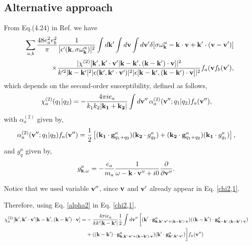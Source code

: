 \documentclass[12pt,a4paper,ruledheader]{report}
\begin{document}
\begin{appendix}
\section{Alternative approach}
\label{sec:alt-approx}
From Eq.(4.24) in Ref. \cite{YZKS16} we have
\begin{eqnarray}
\label{Eq4.24}
&&
\sum_{a,b}\frac{48e_a^2e_b^2}{\pi}\frac{1}{[\epsilon'({\bf k},\sigma
\omega_{\bf k}^\alpha)]^2}\int d{\bf k'}\int d{\bf v}\int d{\bf v'}
\delta[\sigma\omega_{\bf k}^\alpha-{\bf k\cdot v}+{\bf k'}\cdot
({\bf v-v'})]\\
&&
\times \frac{|\chi^{(2)}[{\bf k'},{\bf k'\cdot v'}|{\bf k-k'},({\bf k-k'})\cdot
{\bf v}]|^2}{k'^2|{\bf k-k'}|^2|\epsilon({\bf k'},{\bf k'\cdot v'})|^2|
\epsilon[{\bf k-k'},({\bf k-k'})\cdot {\bf v}]|^2}f_a({\bf v}f_b({\bf v'}),
\nonumber
\end{eqnarray}
which depends on the second-order susceptibility, defined as follows,
\begin{eqnarray}
\label{chi2,1}
\chi_a^{(2)} (q_1|q_2)=-\frac{4\pi i e_a}{k_1k_2|{\bf k_1}+{\bf k_2}|}
\int d{\bf v''}\, \alpha_a^{(2)}({\bf v''};q_1|q_2)f_a({\bf v''}),
\end{eqnarray}
with $\alpha_a^{(2)}$ given by,
\begin{eqnarray}
\label{alpha2}
\alpha_a^{(2)}({\bf v''};q_1|q_2)f_a({\bf v''})=\frac{1}{2}\left[
({\bf k_1}\cdot{\bf g}_{q_1+q_2}^a)({\bf k_2}\cdot g_{q_2}^a)
+({\bf k_2}\cdot{\bf g}_{q_1+q_2}^a)({\bf k_1}\cdot g_{q_1}^a)\right],
\end{eqnarray}
and $g_q^a$ given by,
\begin{eqnarray}
\label{goper}
g_{{\bf k},\omega}^a=-\frac{e_a}{m_a}\frac{1}{\omega-{\bf k}\cdot{\bf v''}+i0}
\frac{\partial}{\partial {\bf v''}}.
\end{eqnarray}

Notice that we used variable ${\bf v''}$, since ${\bf v}$ and ${\bf v'}$ 
already appear in Eq. \eqref{chi2,1}.

Therefore, using Eq. \eqref{alpha2} in Eq. \eqref{chi2,1},
\begin{equation}
\begin{split}
\chi_a^{(2)}[{\bf k'},{\bf k'\cdot v'}|{\bf k-k'},({\bf k-k'})\cdot{\bf v}]
=&-\frac{4\pi ie_a}{k k'|{\bf k-k'}|}\frac{1}{2}\int d{\bf v''}\,\biggl[
({\bf k'}\cdot
{\bf g}_{{\bf k},{\bf k'}\cdot {\bf v'}+({\bf k-k'})\cdot {\bf v}}^a)
(({\bf k-k'})\cdot 
{\bf g}_{{\bf k-k'},({\bf k-k'})\cdot {\bf v}}^a)\\
&+(({\bf k-k'})\cdot
{\bf g}_{{\bf k},{\bf k'}\cdot {\bf v'}+({\bf k-k'})\cdot {\bf v}}^a)
({\bf k'}\cdot 
{\bf g}_{{\bf k'},{\bf k'}\cdot {\bf v'}}^a)
\biggr] f_a({\bf v''})
\end{split}
\end{equation}


\end{appendix}
\end{document}
